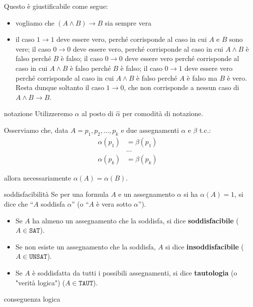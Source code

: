 \documentclass[a4paper,12pt]{report}
\begin{document}
Questo è giustificabile come segue:
\begin{itemize}
    \item vogliamo che \( (A \land B) \to B \) sia sempre vera
    \item il caso \( 1 \to 1 \) deve essere vero, perché corrisponde al caso in cui \( A \) e \( B \) sono vere; il caso \( 0 \to 0  \) deve essere vero, perché corrisponde al caso in cui \( A\land B \) è falso perché \( B \) è falso; il caso \( 0 \to 0 \) deve essere vero perché corrisponde al caso in cui \( A \land B \) è falso perché \( B \) è falso; il caso \( 0 \to 1 \) deve essere vero perché corrisponde al caso in cui \( A \land B \) è falso perché \( A \) è falso ma \( B \) è vero. Resta dunque soltanto il caso \( 1 \to 0 \), che non corrisponde a nessun caso di \( A \land B \to B \).
\end{itemize}


\begin{gbox}{notazione}
    Utilizzeremo \( \alpha \) al posto di \( \hat{\alpha} \) per comodità di notazione.
\end{gbox}

Osserviamo che, data \( A = p_1, p_2, \dots, p_k \) e due assegnamenti \( \alpha \) e \( \beta \) t.c.:
        \begin{align*}
            \alpha(p_1) &= \beta(p_1) \\
            &\dots \\
            \alpha(p_k) &= \beta(p_k)
        \end{align*}

        allora necessariamente \( \alpha(A) = \alpha(B) \).

        \begin{gbox}[colframe=PineGreen]{soddisfacibilità}
            Se per una formula \( A \) e un assegnamento \( \alpha \) si ha \( \alpha (A) = 1 \), si dice che ``\(A \) soddisfa \( \alpha \)'' (o ``\( A \) è vera sotto \( \alpha \)'').
            \begin{itemize}
                \item Se \( A \) ha almeno un assegnamento che la soddisfa, si dice \textbf{soddisfacibile} (\( A \in \texttt{SAT} \)).
                \item Se non esiste un assegnamento che la soddisfa, \( A \) si dice \textbf{insoddisfacibile} (\( A \in \texttt{UNSAT} \)).
                \item Se \( A \) è soddisfatta da tutti i possibili assegnamenti, si dice \textbf{tautologia} (o "verità logica") (\( A \in \texttt{TAUT} \)).
            \end{itemize}
        \end{gbox}


        \begin{defbox}{conseguenza logica}{}
            
        \end{defbox}
\end{document}
